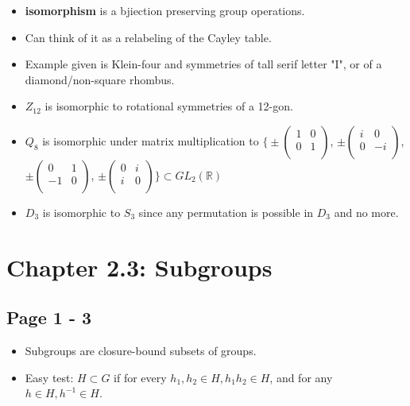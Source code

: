 \documentclass[11pt, oneside]{article}   	%
\begin{document}
\begin{itemize}
\item \textbf{isomorphism} is a bjiection preserving group operations.
\item Can think of it as a relabeling of the Cayley table.
\item Example given is Klein-four and symmetries of tall serif letter "I", or of a diamond/non-square rhombus.
\item $Z_{12}$ is isomorphic to rotational symmetries of a 12-gon.
\item $Q_8$ is isomorphic under matrix multiplication to 
$\Bigg\{\pm \begin{pmatrix}
    1      & 0 \\
    0       & 1 \\

\end{pmatrix}
$, 
$\pm \begin{pmatrix}
    i      & 0 \\
    0       & -i \\

\end{pmatrix}
$, 
$\pm \begin{pmatrix}
    0      & 1 \\
    -1       & 0 \\

\end{pmatrix}
$, 
$\pm \begin{pmatrix}
    0      & i \\
    i       & 0 \\

\end{pmatrix}
\Bigg\} \subset GL_2(\mathbb{R})$ 
\item $D_3$ is isomorphic to $S_3$ since any permutation is possible in $D_3$ and no more.
\end{itemize}


\section {Chapter 2.3: Subgroups}

\subsection {Page 1 - 3}

\begin{itemize}
\item Subgroups are closure-bound subsets of groups.  
\item Easy test: $H \subset G$ if for every $h_1, h_2 \in H, h_1h_2 \in H$, and for any $h \in H, h^{-1} \in H$.
\end{itemize}
\end{document}
